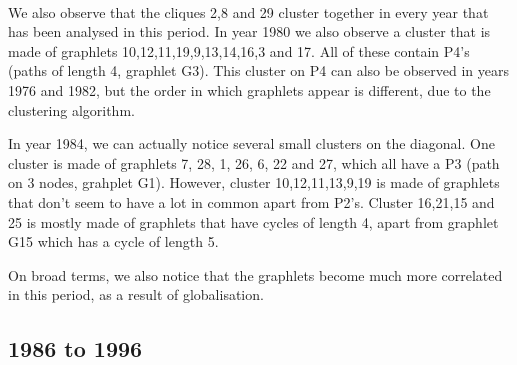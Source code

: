 \documentclass[11pt,a4paper,oneside]{report}
\begin{document}
\begin{figure}[H]
  \\

\end{figure}

We also observe that the cliques 2,8 and 29 cluster together in every year 
that has been analysed in this period. In year 1980 we also observe  a cluster 
that is made of graphlets 10,12,11,19,9,13,14,16,3 and 17. All of these 
contain P4's (paths of length 4, graphlet G3). This cluster on P4 can also be 
observed in years 1976 and 1982, but the order in which graphlets appear is 
different, due to the clustering algorithm.

In year 1984, we can actually notice several small clusters on the diagonal. 
One cluster is made of graphlets 7, 28, 1, 26, 6, 22 and 27, which all have a 
P3 (path on 3 nodes, grahplet G1). However, cluster 10,12,11,13,9,19 is 
made of graphlets that don't seem to have a lot in common apart from P2's. 
Cluster 16,21,15 and 25 is mostly made of graphlets that have cycles of length 
4, apart from graphlet G15 which has a cycle of length 5.

On broad terms, we also notice that the graphlets become much more correlated 
in this period, as a result of globalisation. 

\subsection*{1986 to 1996}
\end{document}
